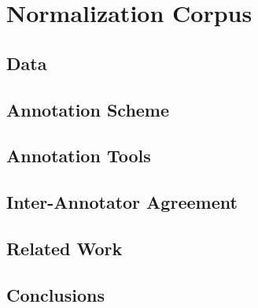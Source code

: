 \section{Normalization Corpus}
\subsection{Data}
\subsection{Annotation Scheme}
\subsection{Annotation Tools}
\subsection{Inter-Annotator Agreement}
\subsection{Related Work}
\subsection{Conclusions}
